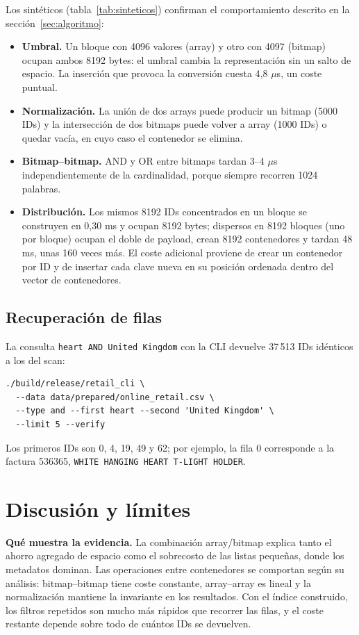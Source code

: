 \documentclass[11pt,a4paper]{article}
\begin{document}
Los sintéticos (tabla~\ref{tab:sinteticos}) confirman el comportamiento descrito en la sección~\ref{sec:algoritmo}:
\begin{itemize}
\item \textbf{Umbral.} Un bloque con 4096 valores (array) y otro con 4097 (bitmap) ocupan ambos 8192 bytes: el umbral cambia la representación sin un salto de espacio. La inserción que provoca la conversión cuesta 4,8 $\mu$s, un coste puntual.
\item \textbf{Normalización.} La unión de dos arrays puede producir un bitmap (5000 IDs) y la intersección de dos bitmaps puede volver a array (1000 IDs) o quedar vacía, en cuyo caso el contenedor se elimina.
\item \textbf{Bitmap--bitmap.} AND y OR entre bitmaps tardan 3--4 $\mu$s independientemente de la cardinalidad, porque siempre recorren 1024 palabras.
\item \textbf{Distribución.} Los mismos 8192 IDs concentrados en un bloque se construyen en 0,30 ms y ocupan 8192 bytes; dispersos en 8192 bloques (uno por bloque) ocupan el doble de payload, crean 8192 contenedores y tardan 48 ms, unas 160 veces más. El coste adicional proviene de crear un contenedor por ID y de insertar cada clave nueva en su posición ordenada dentro del vector de contenedores.
\end{itemize}

\subsection{Recuperación de filas}
La consulta \texttt{heart AND United Kingdom} con la CLI devuelve 37\,513 IDs idénticos a los del scan:
\begin{verbatim}
./build/release/retail_cli \
  --data data/prepared/online_retail.csv \
  --type and --first heart --second 'United Kingdom' \
  --limit 5 --verify
\end{verbatim}
Los primeros IDs son 0, 4, 19, 49 y 62; por ejemplo, la fila 0 corresponde a la factura 536365, \texttt{WHITE HANGING HEART T-LIGHT HOLDER}.

\section{Discusión y límites}
\textbf{Qué muestra la evidencia.} La combinación array/bitmap explica tanto el ahorro agregado de espacio como el sobrecosto de las listas pequeñas, donde los metadatos dominan. Las operaciones entre contenedores se comportan según su análisis: bitmap--bitmap tiene coste constante, array--array es lineal y la normalización mantiene la invariante en los resultados. Con el índice construido, los filtros repetidos son mucho más rápidos que recorrer las filas, y el coste restante depende sobre todo de cuántos IDs se devuelven.
\end{document}
